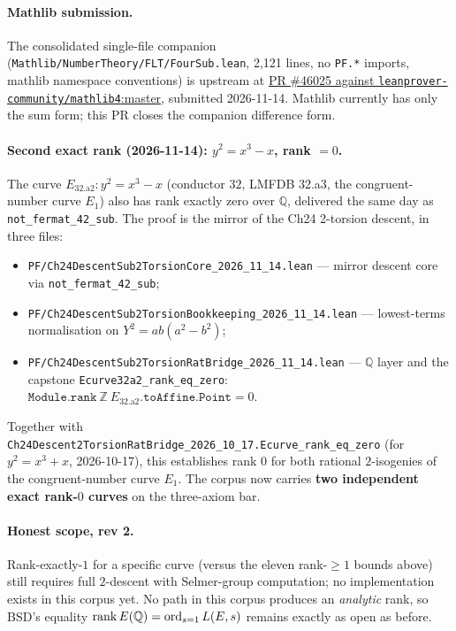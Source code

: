 \paragraph{Mathlib submission.}

The consolidated single-file companion (\texttt{Mathlib/NumberTheory/FLT/FourSub.lean},
2{,}121 lines, no \texttt{PF.*} imports, mathlib namespace conventions) is
upstream at \href{https://github.com/leanprover-community/mathlib4/pull/46025}
{PR \#46025 against \texttt{leanprover-community/mathlib4}:master}, submitted
2026-11-14.  Mathlib currently has only the sum form; this PR closes the
companion difference form.

\paragraph{Second exact rank (2026-11-14): $y^2 = x^3 - x$, rank $= 0$.}

The curve $E_{32.\text{a}2}: y^2 = x^3 - x$ (conductor $32$, LMFDB
32.a3, the congruent-number curve $E_1$) also has rank exactly zero
over $\mathbb{Q}$, delivered the same day as
\texttt{not\_fermat\_42\_sub}.  The proof is the mirror of the Ch24
2-torsion descent, in three files:
\begin{itemize}
\item \texttt{PF/Ch24DescentSub2TorsionCore\_2026\_11\_14.lean} ---
  mirror descent core via \texttt{not\_fermat\_42\_sub};
\item \texttt{PF/Ch24DescentSub2TorsionBookkeeping\_2026\_11\_14.lean}
  --- lowest-terms normalisation on $Y^2 = ab(a^2 - b^2)$;
\item \texttt{PF/Ch24DescentSub2TorsionRatBridge\_2026\_11\_14.lean}
  --- $\mathbb{Q}$ layer and the capstone
  \texttt{Ecurve32a2\_rank\_eq\_zero}:
  $\mathtt{Module.rank}\ \mathbb{Z}\ E_{32.\text{a}2}.\mathtt{toAffine.Point}
  = 0$.
\end{itemize}
Together with
\texttt{Ch24Descent2TorsionRatBridge\_2026\_10\_17.Ecurve\_rank\_eq\_zero}
(for $y^2 = x^3 + x$, 2026-10-17), this establishes rank $0$ for both
rational $2$-isogenies of the congruent-number curve $E_1$.  The
corpus now carries \textbf{two independent exact rank-$0$ curves} on
the three-axiom bar.

\paragraph{Honest scope, rev 2.}

Rank-exactly-$1$ for a specific curve (versus the eleven rank-$\ge 1$
bounds above) still requires full $2$-descent with Selmer-group
computation; no implementation exists in this corpus yet.  No path in
this corpus produces an \emph{analytic} rank, so BSD's equality
$\operatorname{rank} E(\mathbb{Q}) = \operatorname{ord}_{s=1} L(E, s)$ remains exactly as open as
before.

